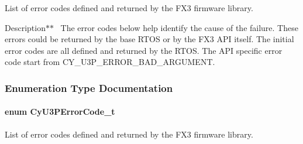 List of error codes defined and returned by the F\+X3 firmware library. 

Description$\ast$$\ast$~\newline
The error codes below help identify the cause of the failure. These errors could be returned by the base R\+T\+OS or by the F\+X3 A\+PI itself. The initial error codes are all defined and returned by the R\+T\+OS. The A\+PI specific error code start from C\+Y\+\_\+\+U3\+P\+\_\+\+E\+R\+R\+O\+R\+\_\+\+B\+A\+D\+\_\+\+A\+R\+G\+U\+M\+E\+NT. 

\subsubsection{Enumeration Type Documentation}
\paragraph[{Cy\+U3\+P\+Error\+Code\+\_\+t}]{\setlength{\rightskip}{0pt plus 5cm}enum {\bf Cy\+U3\+P\+Error\+Code\+\_\+t}}\label{cyu3error_8h_af668bfc4c39252082d2e9d4c221a9e12}


List of error codes defined and returned by the F\+X3 firmware library. 

